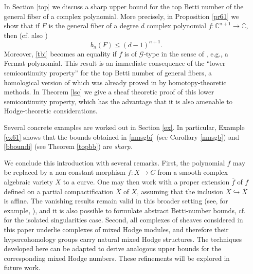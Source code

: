 \documentclass[12pt,leqno,twoside]{amsart}
\newtheorem{theorem}{Theorem}[section]
\theoremstyle{remark}
\theoremstyle{remark}
\theoremstyle{definition}
\theoremstyle{remark}
\theoremstyle{remark}
\theoremstyle{remark}
\numberwithin{equation}{section}  %
\def\be{\begin{equation}}
\def\ee{\end{equation}}
\newcommand{\C}{\mathbb{C}}
\newcommand{\Q}{\mathbb{Q}}
\newcommand{\cG}{\mathcal{G}}
\newcommand{\of}{\overline{f}}
\newcommand{\oX}{\overline{X}}
\begin{document}


\medskip

In Section \ref{top} we discuss a sharp upper bound for the top Betti number of the general fiber of a complex polynomial. More precisely, in Proposition \ref{pr61} we show that if $F$ is the general fiber of a degree $d$ complex polynomial $f\colon \C^{n+1} \to \C$, then (cf. also \cite{ST1,ST2,T2})
\be\label{tbi}
b_n(F)\leq (d-1)^{n+1}.
\ee
Moreover, \eqref{tbi} becomes an equality if $f$ is of $\cG$-type in the sense of \cite{T2}, e.g., a Fermat polynomial. This result is an immediate consequence of the  ``lower semicontinuity property'' for the top Betti number of general fibers, a homological version of which was already proved in \cite{ST1,T2} by homotopy-theoretic methods. In Theorem \ref{lsc} we give  a sheaf theoretic proof of this lower semicontinuity property, which has the advantage that it is also amenable to Hodge-theoretic considerations. 


\medskip

Several concrete examples are worked out in Section \ref{ex}. In particular, Example \ref{ex61} shows that the bounds obtained in \eqref{nmsgbi} (see Corollary \ref{nmsgb}) and \eqref{bboundi} (see Theorem \ref{topbb}) are {\it sharp}.

\medskip


We conclude this introduction with several remarks. First, the polynomial $f$ may be replaced by a non-constant morphism $f:X \to C$ from a smooth complex algebraic variety $X$ to a curve. One may then work with a proper extension $\of$ of $f$ defined on a partial compactification $\oX$ of $X$, assuming that the inclusion $X\hookrightarrow \oX$ is affine. The vanishing results remain valid in this broader setting (see, for example, \cite{Bre}), and it is also possible to formulate abstract Betti-number bounds, cf. \cite{Di} for the isolated singularities case.
Second, all complexes of sheaves considered in this paper underlie complexes of mixed Hodge modules, and therefore their hypercohomology groups carry natural mixed Hodge structures. The techniques developed here can be adapted to derive analogous upper bounds for the corresponding mixed Hodge numbers. These refinements will be explored in future work.
\end{document}
